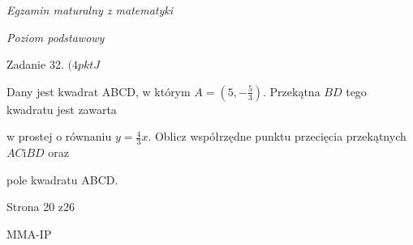 \documentclass[a4paper,12pt]{article}
\begin{document}
{\it Egzamin maturalny z matematyki}

{\it Poziom podstawowy}

Zadanie 32. $(4pktJ$

Dany jest kwadrat ABCD, w którym $A=(5,-\displaystyle \frac{5}{3})$. Przekątna $BD$ tego kwadratu jest zawarta

w prostej o równaniu $y=\displaystyle \frac{4}{3}x$. Oblicz współrzędne punktu przecięcia przekątnych $AC\mathrm{i}BD$ oraz

pole kwadratu ABCD.

Strona 20 z26

MMA-IP
\end{document}
